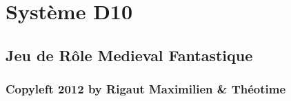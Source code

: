\documentclass[12pt]{book}
\begin{document}
\chapter*{\Huge \center Système D10}
\thispagestyle{empty}
\section*{\center Jeu de Rôle Medieval Fantastique}

\subsection*{\center \normalsize Copyleft 2012 by Rigaut Maximilien \& Théotime}

\begin{center}
    \\[2.5ex]
    {\tiny\CcNote{\CcLongnameByNcSa}}
    \vspace*{-2.5ex}
\end{center}

\frontmatter
 


\tableofcontents

\mainmatter





\end{document}
